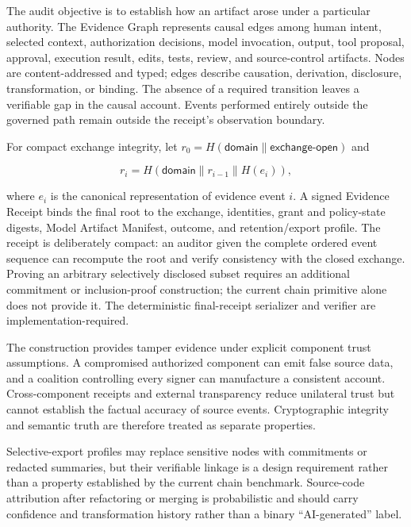 \documentclass[10pt]{article}
\begin{document}
The audit objective is to establish how an artifact arose under a particular authority. The Evidence Graph represents causal edges among human intent, selected context, authorization decisions, model invocation, output, tool proposal, approval, execution result, edits, tests, review, and source-control artifacts. Nodes are content-addressed and typed; edges describe causation, derivation, disclosure, transformation, or binding. The absence of a required transition leaves a verifiable gap in the causal account. Events performed entirely outside the governed path remain outside the receipt's observation boundary.

For compact exchange integrity, let $r_0=H(\textsf{domain}\parallel\textsf{exchange-open})$ and

\begin{equation}
r_i = H(\textsf{domain}\parallel r_{i-1}\parallel H(e_i)),
\end{equation}

where $e_i$ is the canonical representation of evidence event $i$. A signed Evidence Receipt binds the final root to the exchange, identities, grant and policy-state digests, Model Artifact Manifest, outcome, and retention/export profile. The receipt is deliberately compact: an auditor given the complete ordered event sequence can recompute the root and verify consistency with the closed exchange. Proving an arbitrary selectively disclosed subset requires an additional commitment or inclusion-proof construction; the current chain primitive alone does not provide it. The deterministic final-receipt serializer and verifier are implementation-required.

The construction provides tamper evidence under explicit component trust assumptions. A compromised authorized component can emit false source data, and a coalition controlling every signer can manufacture a consistent account. Cross-component receipts and external transparency reduce unilateral trust but cannot establish the factual accuracy of source events. Cryptographic integrity and semantic truth are therefore treated as separate properties.

Selective-export profiles may replace sensitive nodes with commitments or redacted summaries, but their verifiable linkage is a design requirement rather than a property established by the current chain benchmark. Source-code attribution after refactoring or merging is probabilistic and should carry confidence and transformation history rather than a binary ``AI-generated'' label.
\end{document}
